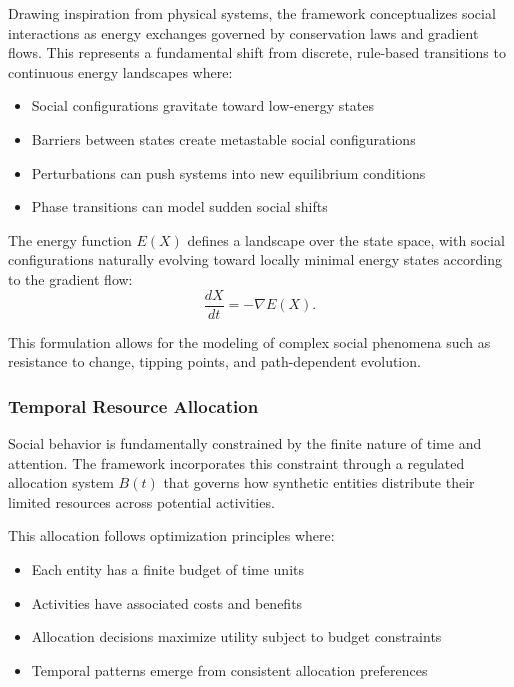 \documentclass[11pt,a4paper]{article}
\begin{document}
Drawing inspiration from physical systems, the framework conceptualizes social interactions as energy exchanges governed by conservation laws and gradient flows. This represents a fundamental shift from discrete, rule-based transitions to continuous energy landscapes where:

\begin{itemize}
\item Social configurations gravitate toward low-energy states
\item Barriers between states create metastable social configurations
\item Perturbations can push systems into new equilibrium conditions
\item Phase transitions can model sudden social shifts
\end{itemize}

The energy function $E(X)$ defines a landscape over the state space, with social configurations naturally evolving toward locally minimal energy states according to the gradient flow:
\begin{equation}
\frac{dX}{dt} = -\nabla E(X).
\end{equation}

This formulation allows for the modeling of complex social phenomena such as resistance to change, tipping points, and path-dependent evolution.

\subsubsection{Temporal Resource Allocation}

Social behavior is fundamentally constrained by the finite nature of time and attention. The framework incorporates this constraint through a regulated allocation system $B(t)$ that governs how synthetic entities distribute their limited resources across potential activities.

This allocation follows optimization principles where:
\begin{itemize}
\item Each entity has a finite budget of time units
\item Activities have associated costs and benefits
\item Allocation decisions maximize utility subject to budget constraints
\item Temporal patterns emerge from consistent allocation preferences
\end{itemize}
\end{document}
